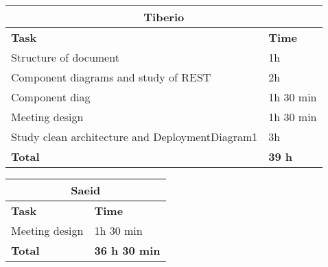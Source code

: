 \begin{table}[H]
\begin{tabular}{|l|l|}
\hline
\multicolumn{2}{|c|}{\textbf{Tiberio}}            \\ \hline
\textbf{Task}                   & \textbf{Time} \\ \hline
Structure of document                & 1h      \\ \hline
Component diagrams and study of REST       & 2h      \\ \hline
Component diag & 1h 30 min \\ \hline
Meeting design & 1h 30 min \\ \hline
Study clean architecture and DeploymentDiagram1 & 3h \\ \hline

\rowcolor {polilight}
\textbf{Total}                  & \textbf{39 h}   \\ \hline
\end{tabular}
\end{table}


\begin{table}[H]
\begin{tabular}{|l|l|}
\hline
\multicolumn{2}{|c|}{\textbf{Saeid}}            \\ \hline
\textbf{Task}                   & \textbf{Time} \\ \hline
Meeting design & 1h 30 min \\ \hline
\rowcolor {polilight}
\textbf{Total}                  & \textbf{36 h 30 min}   \\ \hline
\end{tabular}
\end{table}
